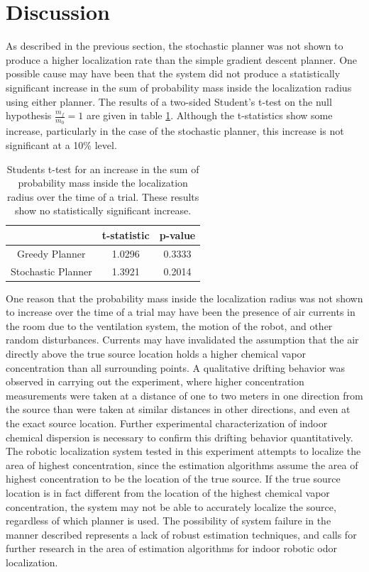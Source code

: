 \documentclass[submit]{aiaa-pretty-modified}
\begin{document}
\section{Discussion}
As described in the previous section, the stochastic planner was not shown to produce a higher localization
rate than the simple gradient descent planner.  One possible cause may
have been
that the system did not produce a statistically significant increase
in the sum of probability mass inside the localization radius using
either planner.  The results of a two-sided Student's t-test on the
null hypothesis $\frac{m_f}{m_0} = 1$ are given in table
\ref{tab:nofind}.  Although the t-statistics show some increase,
particularly in the case of the stochastic planner, this increase is
not significant at a 10\% level.

\begin{table}[htb]
\begin{center}
\begin{tabular}{|c||c|c|}
\hline
& t-statistic & p-value \\
\hline \hline
Greedy Planner & 1.0296 & 0.3333\\
\hline
Stochastic Planner& 1.3921 &0.2014\\
\hline
\end{tabular}
\caption{Students t-test for an increase in the sum of probability
  mass inside the localization radius over the time of a trial.
  These results show no statistically significant increase. \label{tab:nofind} }
\end{center}
\end{table}


One reason that the probability mass inside the localization
radius was not shown to increase over the time of a trial may have been
the presence of air currents in the room due to the ventilation
system, the motion of the robot, and other random disturbances. Currents may have invalidated the
assumption that the air directly above the true source location
holds a higher chemical vapor concentration than all surrounding
points.  A qualitative drifting behavior was observed in carrying out
the experiment, where higher concentration measurements were taken
at a distance of one to two meters in one direction from the source than were
taken at similar distances in other directions, and even at the exact
source location.  Further experimental characterization of indoor
chemical dispersion is necessary to confirm this drifting
behavior quantitatively.  The robotic localization system tested in
this experiment attempts to localize the area of highest
concentration, since the estimation algorithms assume the area of highest
concentration to be the location of the true source.  If the true
source location is in fact different from the location of the
highest chemical vapor concentration, the system may not be able to accurately
localize the source, regardless of which planner is used.  The
possibility of system failure in the manner described represents a lack of robust estimation techniques, and
calls for further research in the area of estimation algorithms for
indoor robotic odor localization.
\end{document}
